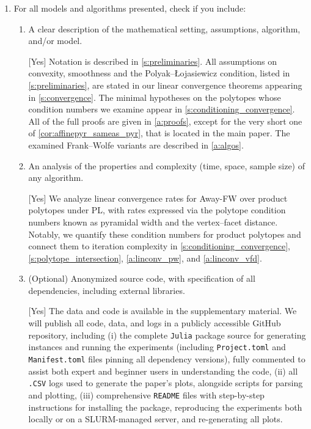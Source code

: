 \documentclass[twoside]{article}
\begin{document}
\begin{enumerate}

\item For all models and algorithms presented, check if you include:
  \begin{enumerate}

\item A clear description of the mathematical setting, assumptions, algorithm, and/or model.

[Yes]
Notation is described in \cref{s:preliminaries}. All assumptions on convexity, smoothness and the Polyak–Łojasiewicz condition, listed in \cref{s:preliminaries}, are stated in our linear convergence theorems appearing in \cref{s:convergence}. The minimal hypotheses on the polytopes whose condition numbers we examine appear in \cref{s:conditioning_convergence}. All of the full proofs are given in \cref{a:proofs}, except for the very short one of \cref{cor:affinepyr_sameas_pyr}, that is located in the main paper.
The examined Frank–Wolfe variants are described in \cref{a:algos}.


\item An analysis of the properties and complexity (time, space, sample size) of any algorithm.

[Yes]
We analyze linear convergence rates for Away-FW over product polytopes under PL, with rates expressed via the polytope condition numbers known as pyramidal width and the vertex–facet distance. Notably, we quantify these condition numbers for product polytopes and connect them to iteration complexity in \cref{s:conditioning_convergence}, \cref{s:polytope_intersection}, \cref{a:linconv_pw}, and \cref{a:linconv_vfd}.

\item (Optional) Anonymized source code, with specification of all dependencies, including external libraries.

[Yes]
The data and code is available in the supplementary material. We will publish all code, data, and logs in a publicly accessible GitHub repository, including (i) the complete \texttt{Julia} package source for generating instances and running the experiments (including \texttt{Project.toml} and \texttt{Manifest.toml} files pinning all dependency versions), fully commented to assist both expert and beginner users in understanding the code, (ii) all \texttt{.CSV} logs used to generate the paper's plots, alongside scripts for parsing and plotting, (iii) comprehensive \texttt{README} files with step-by-step instructions for installing the package, reproducing the experiments both locally or on a SLURM-managed server, and re-generating all plots.


\end{enumerate}
\end{enumerate}
\end{document}
